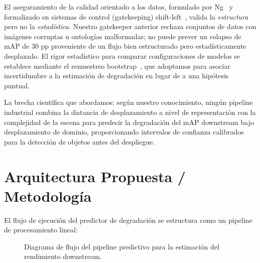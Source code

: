 \documentclass[10pt,twocolumn,letterpaper]{article}
\begin{document}
El aseguramiento de la calidad orientado a los datos, formulado por Ng~\cite{ng2021data} y formalizado en sistemas de control (gatekeeping) shift-left~\cite{greatexpectations2023}, valida la \emph{estructura} pero no la \emph{estadística}. Nuestro gatekeeper anterior rechaza conjuntos de datos con imágenes corruptas u ontologías malformadas; no puede prever un colapso de mAP de 30 pp proveniente de un flujo bien estructurado pero estadísticamente desplazado. El rigor estadístico para comparar configuraciones de modelos se establece mediante el remuestreo bootstrap~\cite{efron1994introduction,demsar2006statistical}, que adoptamos para asociar incertidumbre a la estimación de degradación en lugar de a una hipótesis puntual.

La brecha científica que abordamos: según nuestro conocimiento, ningún pipeline industrial combina la distancia de desplazamiento a nivel de representación con la complejidad de la escena para predecir la degradación del mAP downstream bajo desplazamiento de dominio, proporcionando intervalos de confianza calibrados para la detección de objetos antes del despliegue.

\section{Arquitectura Propuesta / Metodología}
El flujo de ejecución del predictor de degradación se estructura como un pipeline de procesamiento lineal:
\begin{figure}[htbp]
\centering
{}
\caption{Diagrama de flujo del pipeline predictivo para la estimación del rendimiento downstream.}
\label{fig:pipeline}
\end{figure}
\end{document}
